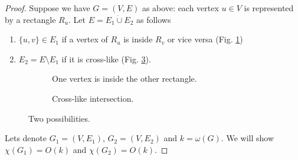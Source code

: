 \begin{proof}
	Suppose we have $G = (V,E)$ as above: each vertex $u \in V$ is represented by a rectangle $R_u$. Let $E = E_1 \dot{\cup} E_2$ as follows
	
	\begin{enumerate}
		\item $\{u,v\} \in E_1$ if a vertex of $R_u$ is inside $R_v$ or vice versa (Fig. \ref{inter-box})
		\item $E_2 = E \setminus E_1$ if it is cross-like (Fig. \ref{cross-box}).
	\end{enumerate}
	
	\begin{figure}[!ht]\centering
		\begin{subfigure}{.45\textwidth}\centering
			\caption{One vertex is inside the other rectangle.}
			\label{inter-box}
		\end{subfigure}
		\begin{subfigure}{.45\textwidth}\centering
			\caption{Cross-like intersection.}
			\label{cross-box}
		\end{subfigure}
		\caption{Two possibilities.}
	\end{figure}
	
	Lets denote $G_1 = (V, E_1)$, $G_2 = (V, E_2)$ and $k = \omega(G)$. We will show $\chi(G_1) = O(k)$ and $\chi(G_2) = O(k)$.
	

\end{proof}
